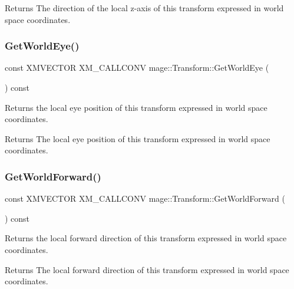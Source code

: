 \begin{DoxyReturn}{Returns}
The direction of the local z-\/axis of this transform expressed in world space coordinates. 
\end{DoxyReturn}
\hypertarget{classmage_1_1_transform_a695601318b2a68b70e48e3f910516ebd}{}\label{classmage_1_1_transform_a695601318b2a68b70e48e3f910516ebd} 
\subsubsection{\texorpdfstring{Get\+World\+Eye()}{GetWorldEye()}}
{\footnotesize\ttfamily const X\+M\+V\+E\+C\+T\+OR X\+M\+\_\+\+C\+A\+L\+L\+C\+O\+NV mage\+::\+Transform\+::\+Get\+World\+Eye (\begin{DoxyParamCaption}{ }\end{DoxyParamCaption}) const\hspace{0.3cm}{\ttfamily [noexcept]}}

Returns the local eye position of this transform expressed in world space coordinates.

\begin{DoxyReturn}{Returns}
The local eye position of this transform expressed in world space coordinates. 
\end{DoxyReturn}
\hypertarget{classmage_1_1_transform_aad9be5a54245e9352b660e6d95118755}{}\label{classmage_1_1_transform_aad9be5a54245e9352b660e6d95118755} 
\subsubsection{\texorpdfstring{Get\+World\+Forward()}{GetWorldForward()}}
{\footnotesize\ttfamily const X\+M\+V\+E\+C\+T\+OR X\+M\+\_\+\+C\+A\+L\+L\+C\+O\+NV mage\+::\+Transform\+::\+Get\+World\+Forward (\begin{DoxyParamCaption}{ }\end{DoxyParamCaption}) const\hspace{0.3cm}{\ttfamily [noexcept]}}

Returns the local forward direction of this transform expressed in world space coordinates.

\begin{DoxyReturn}{Returns}
The local forward direction of this transform expressed in world space coordinates. 
\end{DoxyReturn}
\hypertarget{classmage_1_1_transform_a546bf5cf343810b3f3cbf6255661035b}{}\label{classmage_1_1_transform_a546bf5cf343810b3f3cbf6255661035b} 
